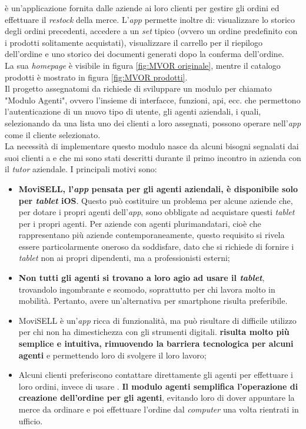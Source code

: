 {\movi} è un'applicazione fornita dalle aziende ai loro clienti per gestire gli ordini ed effettuare il \textit{restock} della merce. 
L'\textit{app} permette inoltre di: visualizzare lo 
storico degli ordini precedenti, accedere a un \textit{set} tipico (ovvero un ordine predefinito con i prodotti solitamente 
acquistati), visualizzare il carrello per il riepilogo dell'ordine e uno storico dei 
documenti generati dopo la conferma dell'ordine.\\
La sua 
\textit{homepage} è visibile in figura \ref{fig:MVOR originale}, mentre il catalogo prodotti è mostrato in figura 
\ref{fig:MVOR prodotti}.\\
Il progetto assegnatomi da {\company} richiede di sviluppare un modulo per {\movi} chiamato "Modulo Agenti", ovvero 
l'insieme di interfacce, funzioni, \gls{api}, ecc. che permettono l'autenticazione di un nuovo tipo di utente, gli agenti aziendali, 
i quali, selezionando da una lista uno dei clienti a loro assegnati, possono operare nell'\textit{app} come il cliente selezionato.\\
La necessità di implementare questo modulo nasce da alcuni bisogni segnalati dai suoi clienti a {\company} e che 
mi sono stati descritti durante il primo incontro in azienda con il \textit{tutor} aziendale. I principali motivi sono:
\begin{itemize}
    \item \textbf{MoviSELL, l'\textit{app} pensata per gli agenti aziendali, è disponibile solo per \textit{tablet} iOS}. Questo può costituire un problema 
          per alcune aziende che, per dotare i propri agenti dell'\textit{app}, sono obbligate ad acquistare questi \textit{tablet} per i propri agenti. 
          Per aziende con agenti plurimandatari, cioè che rappresentano più aziende contemporaneamente, questo requisito si 
          rivela essere particolarmente oneroso da soddisfare, dato che si richiede di fornire i \textit{tablet} non ai propri dipendenti, 
          ma a professionisti esterni;
    \item \textbf{Non tutti gli agenti si trovano a loro agio ad usare il \textit{tablet}}, trovandolo ingombrante e scomodo, soprattutto per chi 
          lavora molto in mobilità. Pertanto, avere un'alternativa per smartphone risulta preferibile.
    \item MoviSELL è un'\textit{app} ricca di funzionalità, ma può risultare di difficile utilizzo per chi non ha dimestichezza con gli 
          strumenti digitali. \textbf{{\movi} risulta molto più semplice e intuitiva, rimuovendo la barriera tecnologica per alcuni 
          agenti} e permettendo loro di svolgere il loro lavoro;
    \item Alcuni clienti preferiscono contattare direttamente gli agenti per effettuare i loro ordini, invece di usare {\movi}. 
          \textbf{Il modulo agenti semplifica l'operazione di creazione dell'ordine per gli agenti}, evitando loro di dover appuntare 
          la merce da ordinare e poi effettuare l'ordine dal \textit{computer} una volta rientrati in ufficio.
\end{itemize}
